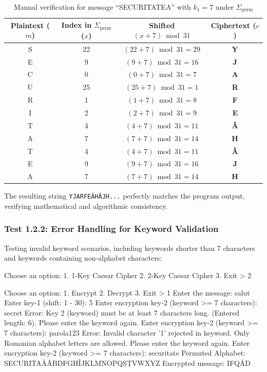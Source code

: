 \documentclass[12pt,a4paper]{article}
\begin{document}
\begin{table}[h!]
\centering
\caption{Manual verification for message ``SECURITATEA'' with $k_1 = 7$ under $\Sigma_{\text{perm}}$}
\label{tab:manual_check}
\small
\begin{tabular}{cccc}
\toprule
\textbf{Plaintext ($m$)} & \textbf{Index in $\Sigma_{\text{perm}}$ ($x$)} & \textbf{Shifted $(x+7) \bmod 31$} & \textbf{Ciphertext ($c$)} \\
\midrule
S & 22 & $(22+7) \bmod 31 = 29$ & \textbf{Y} \\
E & 9  & $(9+7) \bmod 31 = 16$  & \textbf{J} \\
C & 0  & $(0+7) \bmod 31 = 7$   & \textbf{A} \\
U & 25 & $(25+7) \bmod 31 = 1$  & \textbf{R} \\
R & 1  & $(1+7) \bmod 31 = 8$   & \textbf{F} \\
I & 2  & $(2+7) \bmod 31 = 9$   & \textbf{E} \\
T & 4  & $(4+7) \bmod 31 = 11$  & \textbf{Â} \\
A & 7  & $(7+7) \bmod 31 = 14$  & \textbf{H} \\
T & 4  & $(4+7) \bmod 31 = 11$  & \textbf{Â} \\
E & 9  & $(9+7) \bmod 31 = 16$  & \textbf{J} \\
A & 7  & $(7+7) \bmod 31 = 14$  & \textbf{H} \\
\bottomrule
\end{tabular}
\end{table}

The resulting string \texttt{YJARFEÂHÂJH...} perfectly matches the program output, verifying mathematical and algorithmic consistency.

\subsubsection{Test 1.2.2: Error Handling for Keyword Validation}
Testing invalid keyword scenarios, including keywords shorter than 7 characters and keywords containing non-alphabet characters:

\begin{terminalwindow}
Choose an option: 
1. 1-Key Caesar Cipher
2. 2-Key Caesar Cipher
3. Exit
> 2

Choose an option: 
1. Encrypt
2. Decrypt
3. Exit
> 1
Enter the message: salut
Enter key-1 (shift: 1 - 30): 5
Enter encryption key-2 (keyword >= 7 characters): secret
Error: Key 2 (keyword) must be at least 7 characters long. (Entered length: 6).
Please enter the keyword again.
Enter encryption key-2 (keyword >= 7 characters): parola123
Error: Invalid character '1' rejected in keyword. Only Romanian alphabet letters are allowed.
Please enter the keyword again.
Enter encryption key-2 (keyword >= 7 characters): securitate
Permuted Alphabet: SECURITAĂÂBDFGHÎJKLMNOPQȘȚVWXYZ
Encrypted message: IFQĂD
\end{terminalwindow}
\end{document}
